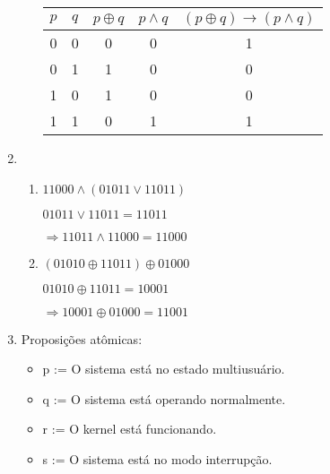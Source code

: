 \documentclass[12pt]{article}
\begin{document}
\begin{enumerate}
\begin{enumerate}
                \begin{center}
                    \begin{tabular}{||c c c c c ||} 
                        \hline
                        \( p \)  & \( q \) & \( p \oplus q  \) & \( p \land  q \) & \( (p \oplus q) \to (p \land q)  \)   \\ [0.5ex]
                        \hline\hline
                        0 & 0 & 0 & 0 & 1 \\ 
                        \hline
                        0 & 1 & 1 & 0 & 0 \\
                        \hline
                        1 & 0 & 1 & 0 & 0 \\
                        \hline
                        1 & 1 & 0 & 1 & 1 \\ [1ex]
                        \hline
                    \end{tabular}
                \end{center}
        \end{enumerate}
    \item 
        \begin{enumerate}
            \item \( 11000 \land (01011 \lor 11011 ) \) 

                \(01011 \lor 11011 = 11011\) 

                \( \Rightarrow 11011 \land 11000 = 11000\) 

            \item \( (01010 \oplus 11011) \oplus 01000\) 

                \( 01010 \oplus 11011 = 10001 \) 

                \( \Rightarrow 10001 \oplus 01000 = 11001\) 

        \end{enumerate}
    \item 
        Proposições atômicas:

        \begin{itemize}
            \item p := O sistema está no estado multiusuário.
            \item q := O sistema está operando normalmente.
            \item r := O kernel está funcionando.
            \item s := O sistema está no modo interrupção.
        \end{itemize}


\end{enumerate}
\end{document}

